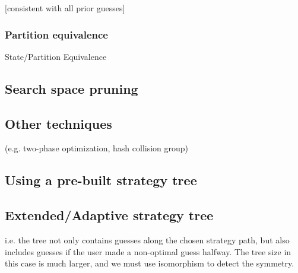 [consistent with all prior guesses]

\subsubsection{Partition equivalence}

State/Partition Equivalence

\subsection{Search space pruning}

\subsection{Other techniques}

(e.g. two-phase optimization, hash collision group)

\subsection{Using a pre-built strategy tree}

\subsection{Extended/Adaptive strategy tree}

i.e. the tree not only contains guesses along the chosen strategy path, but also includes guesses if the user made a non-optimal guess halfway. The tree size in this case is much larger, and we must use isomorphism to detect the symmetry.

 
